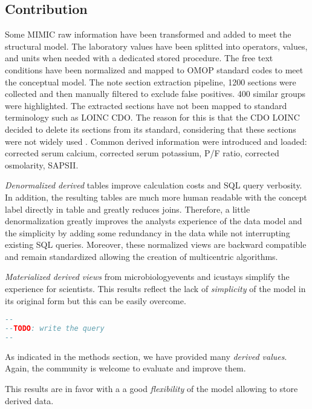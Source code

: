 %
%
\subsection{Contribution}
%
%
Some MIMIC raw information have been transformed and added to meet the
structural model. The laboratory values have been splitted into operators,
values, and units when needed with a dedicated stored procedure. The free text
conditions have been normalized and mapped to OMOP standard codes to meet the
conceptual model.
The note section extraction pipeline, 1200 sections were collected and then
manually filtered to exclude false positives.  400 similar groups were
highlighted. The extracted sections have not been mapped to standard
terminology such as LOINC CDO. The reason for this is that the CDO LOINC
decided to delete its sections from its standard, considering that these
sections were not widely used  \cite{loinc-website}.
Common derived information were introduced and loaded: corrected serum calcium,
corrected serum potassium, P/F ratio, corrected osmolarity, SAPSII.

%
\emph{Denormalized derived} tables improve calculation costs and SQL query
verbosity.  In addition, the resulting tables are much more human readable with
the concept label directly in table and greatly reduces joins. Therefore, a
little denormalization greatly improves the analysts experience of the data
model and the simplicity by adding some redundancy in the data while not
interrupting existing SQL queries. Moreover, these normalized views are
backward compatible and remain standardized allowing the creation of
multicentric algorithms.

\emph{Materialized derived views} from microbiologyevents and icustays simplify
the experience for scientists.  This results reflect the lack of
\textit{simplicity} of the model in its original form but this can be easily
overcome.

\begin{lstlisting}[language=sql,basicstyle=\scriptsize,caption=Optimized table microbiology SQL query,label={lst:optimized}]
--
--TODO: write the query
--
\end{lstlisting}

As indicated in the methods section, we have provided many \emph{derived values}. 
Again, the community is welcome to evaluate and improve them.   

This results are in favor with a a good \textit{flexibility} of the model
allowing to store derived data.

